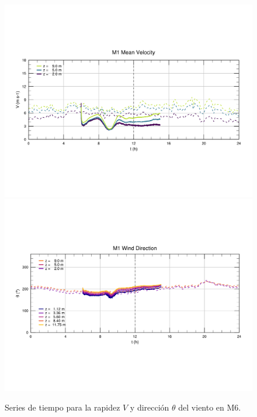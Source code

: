 \begin{figure}[H]
	\centering
	\includegraphics[width=0.87\linewidth,page=6,trim={9mm 57mm 10mm 60mm},clip]{Imagenes/06/bol/ts_interpol_compare.pdf}\\%
	\includegraphics[width=0.87\linewidth,page=6,trim={12mm 52mm 10mm 60mm},clip]{Imagenes/06/bol/ts_interpol_compare_o.pdf}%
	\vspace{-2mm}\caption{Series de tiempo para la rapidez $V$ y dirección $\theta$ del viento en M6.}
	\label{fig:06_bol_ts_m6}
\end{figure}

